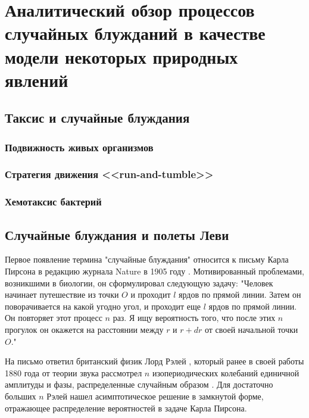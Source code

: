 \chapter{Аналитический обзор процессов случайных блужданий в качестве модели некоторых природных явлений}\label{ch:ch1}

\section{Таксис и случайные блуждания}\label{sec:ch1/sec1}

\subsection{Подвижность живых организмов}\label{subsec:ch1/sec1/sub1}

\subsection{Стратегия движения <<run-and-tumble>>}\label{subsec:ch1/sec1/sub2}

\subsection{Хемотаксис бактерий}\label{subsec:ch1/sec1/sub3}



\section{Случайные блуждания и полеты Леви}\label{sec:ch1/sec2}


Первое появление термина "случайные блуждания" относится к письму Карла Пирсона в редакцию журнала Nature в 1905 году \cite{pearson_problem_1905}. Мотивированный проблемами, возникшими в биологии, он сформулировал следующую задачу: "Человек начинает путешествие из точки $O$ и проходит $l$ ярдов по прямой линии. Затем он поворачивается на какой угодно угол, и проходит еще $l$ ярдов по прямой линии. 
Он повторяет этот процесс $n$ раз. Я ищу вероятность того, что после этих $n$ прогулок он окажется на расстоянии между $r$ и $r+dr$ от своей начальной точки $O$."

На письмо ответил британский физик Лорд Рэлей \cite{rayleigh_problem_1905}, который ранее в своей работы 1880 года от теории звука рассмотрел $n$ изопериодических колебаний единичной амплитуды и фазы, распределенные случайным образом \cite{rayleigh_lxi_1877}. Для достаточно больших $n$ Рэлей нашел асимптотическое решение в замкнутой форме, отражающее распределение вероятностей в задаче Карла Пирсона. 

